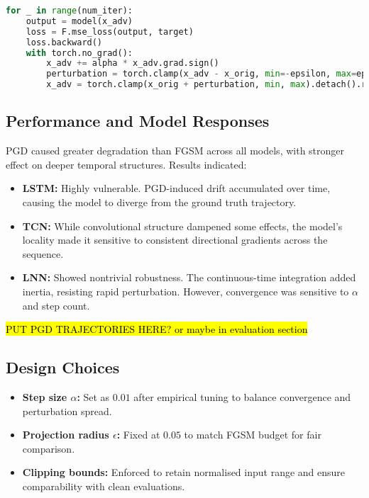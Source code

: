 \begin{lstlisting}[language=Python, caption={PGD Attack Loop (Simplified)}]
for _ in range(num_iter):
    output = model(x_adv)
    loss = F.mse_loss(output, target)
    loss.backward()
    with torch.no_grad():
        x_adv += alpha * x_adv.grad.sign()
        perturbation = torch.clamp(x_adv - x_orig, min=-epsilon, max=epsilon)
        x_adv = torch.clamp(x_orig + perturbation, min, max).detach().requires_grad_()
\end{lstlisting}

\subsection{Performance and Model Responses}
PGD caused greater degradation than FGSM across all models, with stronger effect on deeper temporal structures. Results indicated:
\begin{itemize}
    \item \textbf{LSTM:} Highly vulnerable. PGD-induced drift accumulated over time, causing the model to diverge from the ground truth trajectory.
    \item \textbf{TCN:} While convolutional structure dampened some effects, the model's locality made it sensitive to consistent directional gradients across the sequence.
    \item \textbf{LNN:} Showed nontrivial robustness. The continuous-time integration added inertia, resisting rapid perturbation. However, convergence was sensitive to $\alpha$ and step count.
\end{itemize}

\hl{PUT PGD TRAJECTORIES HERE? or maybe in evaluation section}


\subsection{Design Choices}
\begin{itemize}
    \item \textbf{Step size $\alpha$:} Set as $0.01$ after empirical tuning to balance convergence and perturbation spread.
    \item \textbf{Projection radius $\epsilon$:} Fixed at $0.05$ to match FGSM budget for fair comparison.
    \item \textbf{Clipping bounds:} Enforced to retain normalised input range and ensure comparability with clean evaluations.
\end{itemize}

